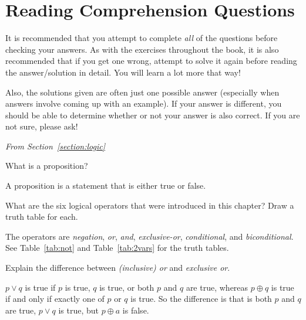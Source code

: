 \section{Reading Comprehension Questions}


\begin{rem}
It is recommended that you attempt to complete {\em all} of the questions before checking your answers. 
As with the exercises throughout the book, it is also recommended that if you get one wrong, 
attempt to solve it again before reading the answer/solution in detail. You will learn a lot more that way!

Also, the solutions given are often just one possible answer (especially when answers involve coming up with an example). 
If your answer is different, 
you should be able to determine whether or not your answer is also correct. If you are not sure, please ask!
\end{rem}

\bigskip

\noindent
{\em From Section~\ref{section:logic}}

\begin{requ}
What is a proposition?
\begin{requanswer}
A proposition is a statement that is either true or false.
\end{requanswer}
\end{requ}

\begin{requ}
What are the six logical operators that were introduced in this chapter?
Draw a truth table for each.
\begin{requanswer}
The operators are {\em negation}, {\em or}, {\em and}, {\em exclusive-or}, {\em conditional}, and {\em biconditional}.
See Table~\ref{tab:not} and  Table~\ref{tab:2vars} for the truth tables.
\end{requanswer}
\end{requ}

\begin{requ}
Explain the difference between {\em (inclusive) or} and {\em exclusive or}.
\begin{requanswer}
$p\vee q$ is true if $p$ is true, $q$ is true, or both $p$ and $q$ are true, whereas
$p\oplus q$ is true if and only if exactly one of $p$ or $q$ is true. So the difference is
that is both $p$ and $q$ are true, $p\vee q$ is true, but $p\oplus a$ is false.
\end{requanswer}
\end{requ}

